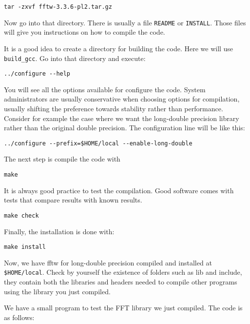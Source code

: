 \begin{lstlisting}
tar -zxvf fftw-3.3.6-pl2.tar.gz
\end{lstlisting}

Now go into that directory. There is usually a file \texttt{README} or \texttt{INSTALL}. Those files will give you instructions on how to compile the code.

It is a good idea to create a directory for building the code. Here we will use \verb|build_gcc|.
Go into that directory and execute:

\begin{lstlisting}
../configure --help
\end{lstlisting}

You will see all the options available for configure the code. System administrators are usually conservative when choosing options for compilation, usually shifting the preference towards stability rather than performance. 
Consider for example the case where we want the long-double precision library rather than the original double precision.
The configuration line will be like this:

\begin{lstlisting}
../configure --prefix=$HOME/local --enable-long-double
\end{lstlisting}

The next step is compile the code with

\begin{lstlisting}
make
\end{lstlisting}

It is always good practice to test the compilation. Good software comes with tests that compare results with known results.

\begin{lstlisting}
make check
\end{lstlisting}

Finally, the installation is done with:

\begin{lstlisting}
make install
\end{lstlisting}

Now, we have fftw for long-double precision compiled and installed at \verb|$HOME/local|. Check by yourself the existence of folders such as lib and include, they contain both the libraries and headers needed to compile other programs using the library you just compiled.

We have a small program to test the FFT library we just compiled. The code is as follows:

